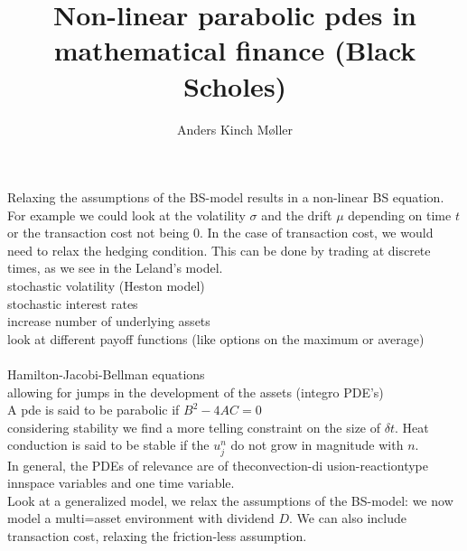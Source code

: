 \documentclass[danish,a4paper,11pt]{article}
\title{Non-linear parabolic pdes in mathematical finance (Black Scholes)}
\author{Anders Kinch Møller}
\date{}
\begin{document}
\maketitle
  Relaxing the assumptions of the BS-model results in a non-linear BS equation. \\
  For example we could look at the volatility \( \sigma \) and the drift \( \mu  \) depending on time \( t \) or the transaction cost not being \( 0 \). In the case of transaction cost, we would need to relax the hedging condition. This can be done by trading at discrete times, as we see in the Leland's model.\\

  stochastic volatility (Heston model)\\
  stochastic interest rates \\
  increase number of underlying assets\\
  look at different payoff functions (like options on the maximum or average)\\
  \\
  Hamilton-Jacobi-Bellman equations \\
  allowing for jumps in the development of the assets (integro PDE's) \\

  A pde is said to be parabolic if \( B^{2} -4AC = 0 \) \\
considering stability we find a more telling constraint on the size of \( \delta t  \). Heat conduction is said to be stable if the \( u_{j}^{n}  \) do not grow in magnitude with \( n \). \\
In general, the PDEs of relevance are of theconvection-di usion-reactiontype innspace variables and one time variable.\\
Look at a generalized model, we relax the assumptions of the BS-model: we now model a multi=asset environment with dividend \( D \). We can also include transaction cost, relaxing the friction-less assumption. \\
\end{document}
